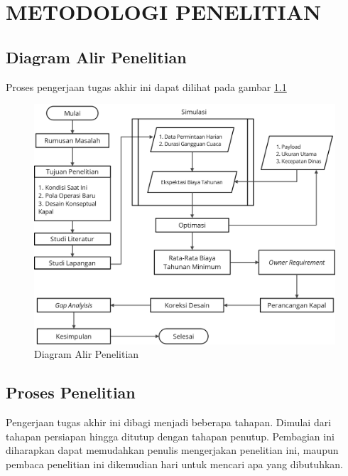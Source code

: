 \chapter{METODOLOGI PENELITIAN}
\label{chap:metodologi}

\section{Diagram Alir Penelitian}
\label{sec:diagram-alir}

Proses pengerjaan tugas akhir ini dapat dilihat pada gambar \ref{fig:diagramkerja} 


\begin{figure}[ht]
  \centering
  \includegraphics[scale=0.75]{gambar/FCV4 Potrait.png}
  \caption{Diagram Alir Penelitian}
  \label{fig:diagramkerja}
\end{figure}

\section{Proses Penelitian}
\label{sec:proses-penelitian}

Pengerjaan tugas akhir ini dibagi menjadi beberapa tahapan. Dimulai dari tahapan persiapan hingga ditutup dengan tahapan penutup. Pembagian ini diharapkan dapat memudahkan penulis mengerjakan penelitian ini, maupun pembaca penelitian ini dikemudian hari untuk mencari apa yang dibutuhkan.

